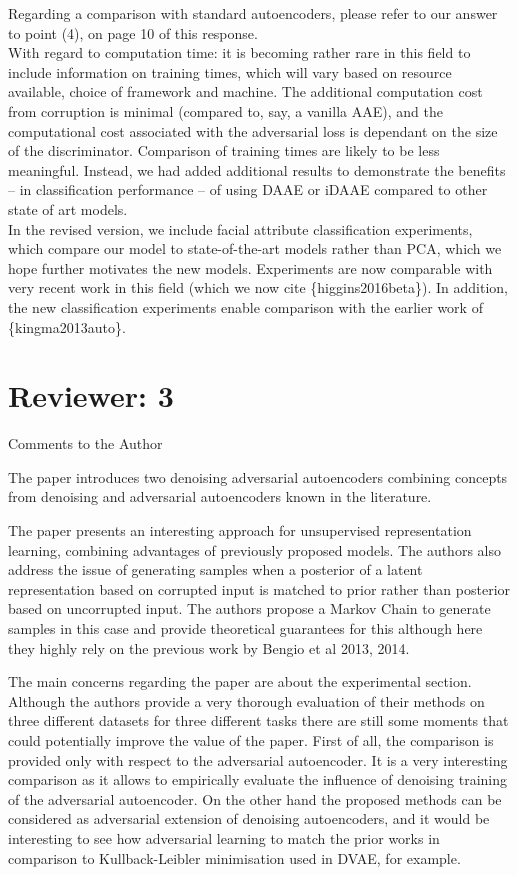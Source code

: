 \documentclass[a4paper,11pt]{article}
\begin{document}
Regarding a comparison with standard autoencoders, please refer to our answer to point (4), on page 10 of this response.\\

With regard to computation time: it is becoming rather rare in this field to include information on training times, which will vary based on resource available, choice of framework and machine. The additional computation cost from corruption is minimal (compared to, say, a vanilla AAE), and the computational cost associated with the adversarial loss is dependant on the size of the discriminator. Comparison of training times are likely to be less meaningful. Instead, we had added additional results to demonstrate the benefits -- in classification performance -- of using DAAE or iDAAE compared to other state of art models.\\

In the revised version, we include facial attribute classification experiments, which compare our model to state-of-the-art models rather than PCA, which we hope further motivates the new models. Experiments are now comparable with very recent work in this field (which we now cite \{higgins2016beta\}). In addition, the new classification experiments enable comparison with the earlier work of \{kingma2013auto\}.

\section{Reviewer: 3}

Comments to the Author
{\color{blue}
The paper introduces two denoising adversarial autoencoders combining concepts from denoising and adversarial autoencoders known in the literature. 

The paper presents an interesting approach for unsupervised representation learning, combining advantages of previously proposed models. The authors also address the issue of generating samples when a posterior of a latent representation based on corrupted input is matched to prior rather than posterior based on uncorrupted input. The authors propose a Markov Chain to generate samples in this case and provide theoretical guarantees for this although here they highly rely on the previous work by Bengio et al 2013, 2014. 

The main concerns regarding the paper are about the experimental section. Although the authors provide a very thorough evaluation of their methods on three different datasets for three different tasks there are still some moments that could potentially improve the value of the paper. First of all, the comparison is provided only with respect to the adversarial autoencoder. It is a very interesting comparison as it allows to empirically evaluate the influence of denoising training of the adversarial autoencoder. On the other hand the proposed methods can be considered as adversarial extension of denoising autoencoders, and it would be interesting to see how adversarial learning to match the prior works in comparison to Kullback-Leibler minimisation used in DVAE, for example.}\\
\end{document}
